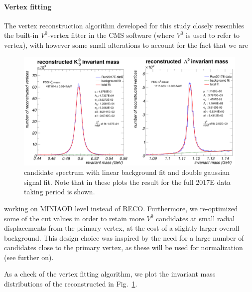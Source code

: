 \paragraph{Vertex fitting}
\label{sec:vertexfitting}

The vertex reconstruction algorithm developed for this study closely
resembles the built-in $V^0$-vertex fitter in the CMS software (where
$V^0$ is used to refer to \PKzS vertex), with however some small
alterations to account for the fact that we are
\begin{figure}
    \includegraphics[clip,trim=0 0 16cm 0, width=0.9\linewidth]{Figures/c6/efficiencies/invmass_mumuskim}
    \caption{\PKzS candidate spectrum with linear background fit and
      double gaussian signal fit. Note that in these plots the result for the full 2017E data taking period is shown.}
    \label{fig:invmass_mumuskim}
\end{figure}
 working on MINIAOD level instead of RECO.
 Furthermore, we re-optimized some of the cut
values in order to retain more $V^0$ candidates at small radial
displacements from the primary vertex, at the cost of a slightly
larger overall background. This design choice was inspired by the need
for a large number of candidates close to the primary vertex, as these
will be used for normalization (see further on). 

As a check of the vertex fitting algorithm, we plot the invariant mass
distributions of the reconstructed \PKzS in
Fig.~\ref{fig:invmass_mumuskim}.

\noindent
